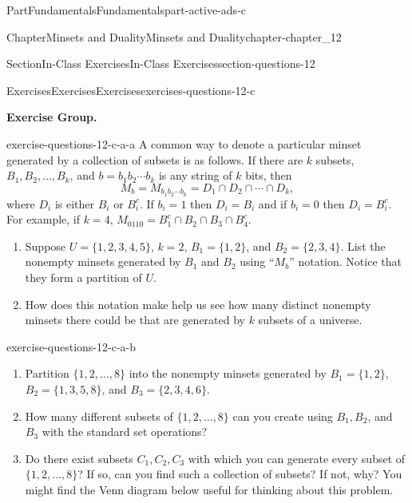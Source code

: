 \documentclass[oneside,10pt,]{book}
\numberwithin{equation}{section}
\begin{document}
\begin{partptx}{Part}{Fundamentals}{}{Fundamentals}{}{}{part-active-ads-c}
\begin{chapterptx}{Chapter}{Minsets and Duality}{}{Minsets and Duality}{}{}{chapter-chapter_12}
\begin{sectionptx}{Section}{In-Class Exercises}{}{In-Class Exercises}{}{}{section-questions-12}
%
%
%
\typeout{************************************************}
\typeout{************************************************}
%
\begin{exercises-subsection-numberless}{Exercises}{Exercises}{}{Exercises}{}{}{exercises-questions-12-c}
\par\medskip\noindent%
\textbf{Exercise Group.}\space\space%
\begin{exercisegroup}
\begin{divisionexerciseeg}{1}{}{}{exercise-questions-12-c-a-a}%
A common way to denote a particular minset generated by a collection of subsets is as follows.  If there are \(k\) subsets, \(B_1, B_2, \dots ,B_k\), and \(b=b_1b_2\cdots b_k\) is any string of \(k\) bits, then%
\begin{equation*}
M_b =  M_{b_1b_2\cdots b_k} = D_1 \cap D_2 \cap \cdots \cap D_k,
\end{equation*}
where \(D_i\) is either \(B_i\) or \(B_i^c\).  If \(b_i = 1\) then \(D_i =B_i\) and if \(b_i=0\) then \(D_i=B_i^c\).  For example, if \(k=4\), \(M_{0110} = B_1^c \cap B_2 \cap B_3 \cap B_4^c\).%
\begin{enumerate}[label=(\alph*)]
\item{}Suppose \(U=\{1, 2, 3, 4, 5\}\), \(k=2\), \(B_1= \{1, 2\}\), and \(B_2 = \{2,3,4\}\).  List the nonempty minsets generated by \(B_1\) and \(B_2\) using ``\(M_b\)'' notation. Notice that they form a partition of \(U\).%
\item{}How does this notation make help us see how many distinct nonempty minsets there could be that are generated by \(k\) subsets of a universe.%
\end{enumerate}
%
\end{divisionexerciseeg}%
\begin{divisionexerciseeg}{2}{}{}{exercise-questions-12-c-a-b}%
%
\begin{enumerate}[label=(\alph*)]
\item{}Partition \(\{1, 2,  \dots, 8\}\) into the nonempty minsets generated by \(B_1= \{1, 2\}\), \(B_2 = \{1, 3, 5, 8\}\), and \(B_3 = \{2, 3, 4, 6\}\).%
\item{}How many different subsets of \(\{1, 2, \dots ,8\}\) can you create using \(B_1, B_2\), and \(B_3\) with the standard set operations?%
\item{}Do there exist subsets \(C_1, C_2, C_3\) with which you can generate every subset of \(\{1,2, . . . ,8\}\)?  If so, can you find such a collection of subsets?  If not, why?  You might find the Venn diagram below useful for thinking about this problem.%

\end{enumerate}
\end{divisionexerciseeg}
\end{exercisegroup}
\end{exercises-subsection-numberless}
\end{sectionptx}
\end{chapterptx}
\end{partptx}
\end{document}
